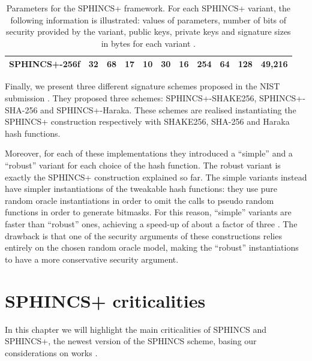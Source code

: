 \documentclass[a4paper,12pt]{article}
\begin{document}
\begin{table}[]
\begin{tabular}{@{}lcccccccccc@{}}
SPHINCS+-256f & 32                             & 68                             & 17                             & 10                                  & 30                             & 16                             & 254                                       & 64                              & 128                             & 49,216                           \\ \bottomrule
\end{tabular}
\caption{Parameters for the SPHINCS+ framework. For each SPHINCS+ variant, the following information is illustrated: values of parameters, number of bits of security provided by the variant, public keys, private keys and signature sizes in bytes for each variant \cite{2_SPHINCS+_round2}.}
\label{tab:parameters}
\end{table}

Finally, we present three different signature schemes proposed in the NIST submission \cite{2_SPHINCS+_round2}. They proposed three schemes:
SPHINCS+-SHAKE256,
SPHINCS+-SHA-256 and 
SPHINCS+-Haraka.
These schemes are realised instantiating the SPHINCS+ construction respectively with SHAKE256, SHA-256 and Haraka hash functions.

Moreover, for each of these implementations they introduced a ``simple'' and a ``robust'' variant for each choice of the hash function.
The robust variant is exactly the SPHINCS+ construction explained so far.
The simple variants instead have simpler instantiations of the tweakable hash functions: they use pure random oracle instantiations in order to omit the calls to pseudo random functions in order to generate bitmasks.
For this reason, ``simple'' variants are faster than ``robust'' ones, achieving a speed-up of about a factor of three \cite{2_SPHINCS+_round2}. The drawback is that one of the security arguments of these constructions relies entirely on the chosen random oracle model, making the ``robust'' instantiations to have a more conservative security argument.




\section{SPHINCS+ criticalities}

In this chapter we will highlight the main criticalities of SPHINCS and SPHINCS+, the newest version of the SPHINCS scheme, basing our considerations on works \cite{4_wings}\cite{7_hashbased}\cite{11_poweranalysis}\cite{12_faultinjection}\cite{13_faultattacks}.
\end{document}
